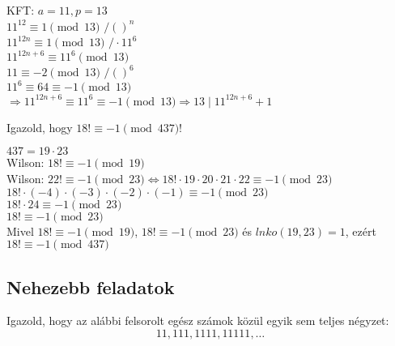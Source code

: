 \begin{solution}
	KFT: $a=11,p=13$\\
	$11^{12}\equiv1\pmod{13}$ $/()^{n}$\\
	$11^{12n}\equiv1\pmod{13}$ $/\cdot11^{6}$\\
	$11^{12n+6}\equiv11^{6}\pmod{13}$ \\
	$11\equiv-2\pmod{13}$ $/()^{6}$\\
	$11^{6}\equiv64\equiv-1\pmod{13}$\\
	$\Rightarrow11^{12n+6}\equiv11^{6}\equiv-1\pmod{13}\Rightarrow13\mid11^{12n+6}+1$ 
\end{solution}
\begin{problem}
	Igazold, hogy $18!\equiv-1\pmod{437}$! 
\end{problem}

\begin{solution}
	$437=19\cdot23$\\
	Wilson: $18!\equiv-1\pmod{19}$\\
	Wilson: $22!\equiv-1\pmod{23}\Leftrightarrow18!\cdot19\cdot20\cdot21\cdot22\equiv-1\pmod{23}$\\
	$18!\cdot(-4)\cdot(-3)\cdot(-2)\cdot(-1)\equiv-1\pmod{23}$\\
	$18!\cdot24\equiv-1\pmod{23}$\\
	$18!\equiv-1\pmod{23}$\\
	Mivel $18!\equiv-1\pmod{19}$, $18!\equiv-1\pmod{23}$ és $lnko(19,23)=1$,
	ezért $18!\equiv-1\pmod{437}$ 
\end{solution}

\subsection*{Nehezebb feladatok}
\begin{extraproblem}
	Igazold, hogy az alábbi felsorolt egész számok közül egyik sem teljes
	négyzet: 
	\[
	11,111,1111,11111,\dots
	\]
\end{extraproblem}

